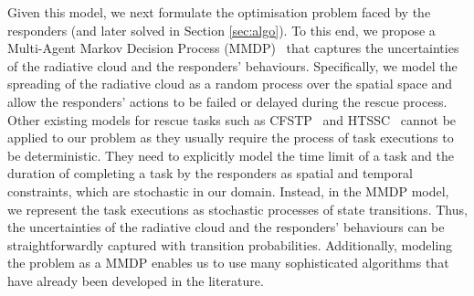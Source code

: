 Given this model, we next formulate the optimisation problem faced by the responders (and later solved in Section \ref{sec:algo}). To this end, we propose a Multi-Agent Markov Decision Process (MMDP)~\cite{?} that captures the uncertainties of the radiative cloud and the responders' behaviours. Specifically, we model the spreading of the radiative cloud as a random process over the spatial space and allow the responders' actions to be failed or delayed during the rescue process. Other existing models for rescue tasks such as CFSTP~\cite{?} and HTSSC~\cite{?} cannot be applied to our problem as they usually require the process of task executions to be deterministic. They need to explicitly model the time limit of a task and the duration of completing a task by the responders as spatial and temporal constraints, which are stochastic in our domain. Instead, in the MMDP model, we represent the task executions as stochastic processes of state transitions. Thus, the uncertainties of the radiative cloud and the responders' behaviours can be straightforwardly captured with transition probabilities. Additionally, modeling the problem as a MMDP enables us to use many sophisticated algorithms that have already been developed in the literature.




